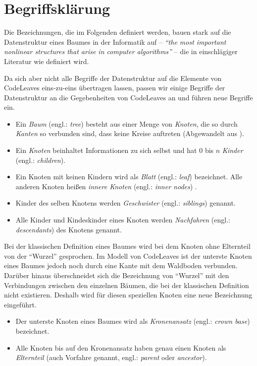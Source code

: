 \section{Begriffsklärung}
\label{sec:naming}

Die Bezeichnungen, die im Folgenden definiert werden, bauen stark auf die Datenstruktur eines Baumes in der Informatik auf -- \textit{"`the most important nonlinear structures that arise in computer algorithms"'}\cite{knuth1973fundamental} -- die in einschlägiger Literatur wie \cite{knuth1973fundamental, ernst2016grundkurs, gumm2009einfuehrung} definiert wird.

Da sich aber nicht alle Begriffe der Datenstruktur auf die Elemente von CodeLeaves eins-zu-eins übertragen lassen, passen wir einige Begriffe der Datenstruktur an die Gegebenheiten von CodeLeaves an und führen neue Begriffe ein.

\begin{itemize}
  \item Ein \textit{Baum} (engl.: \textit{tree}) besteht aus einer Menge von \textit{Knoten}, die so durch \textit{Kanten} so verbunden sind, dass keine Kreise auftreten (Abgewandelt aus \cite{gumm2009einfuehrung, ernst2016grundkurs}).
  \item Ein \textit{Knoten} beinhaltet Informationen zu sich selbst und hat $0$ bis $n$ \textit{Kinder} (engl.: \textit{children}).
  \item Ein Knoten mit keinen Kindern wird als \textit{Blatt} (engl.: \textit{leaf}) bezeichnet. Alle anderen Knoten heißen \textit{innere Knoten} (engl.: \textit{inner nodes}) \cite{gumm2009einfuehrung}.
  \item Kinder des selben Knotens werden \textit{Geschwister} (engl.: \textit{siblings}) genannt.
  \item Alle Kinder und Kindeskinder eines Knoten werden \textit{Nachfahren} (engl.: \textit{descendants}) des Knotens genannt.
\end{itemize}

Bei der klassischen Definition eines Baumes wird bei dem Knoten ohne Elternteil von der "`Wurzel"' gesprochen. Im Modell von CodeLeaves ist der unterste Knoten eines Baumes jedoch noch durch eine Kante mit dem Waldboden verbunden. Darüber hinaus überschneidet sich die Bezeichnung von "`Wurzel"' mit den Verbindungen zwischen den einzelnen Bäumen, die bei der klassischen Definition nicht existieren. Deshalb wird für diesen speziellen Knoten eine neue Bezeichnung eingeführt.

\begin{itemize}
  \item Der unterste Knoten eines Baumes wird als \textit{Kronenansatz} (engl.: \textit{crown base}) bezeichnet.
  \item Alle Knoten bis auf den Kronenansatz haben genau einen Knoten als \textit{Elternteil} (auch Vorfahre genannt, engl.: \textit{parent} oder \textit{ancestor}).
\end{itemize}

